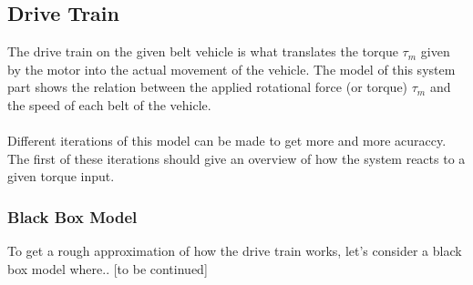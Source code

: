 \subsection{Drive Train}\label{DriveTrain}

The drive train on the given belt vehicle is what translates the torque $\tau_m$ given by the motor into the actual movement of the vehicle. The model of this system part shows the relation between the applied rotational force (or torque) $\tau_m$ and the speed of each belt of the vehicle.\\\\
%
Different iterations of this model can be made to get more and more acuraccy. The first of these iterations should give an overview of how the system reacts to a given torque input. 

\subsubsection{Black Box Model}\label{BlackBoxModel}
To get a rough approximation of how the drive train works, let's consider a black box model where.. [to be continued]